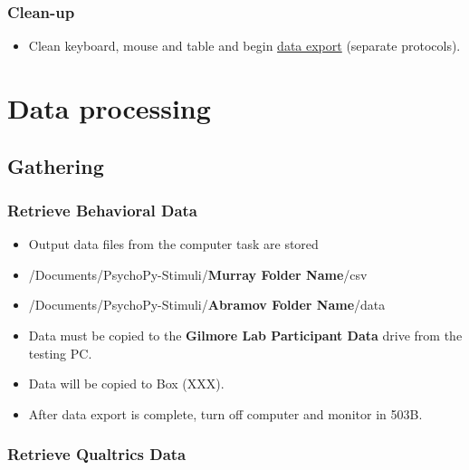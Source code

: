 \documentclass[]{article}
\providecommand{\tightlist}{%
  \setlength{\itemsep}{0pt}\setlength{\parskip}{0pt}}
\begin{document}
\subsubsection{Clean-up}\label{clean-up}

\begin{itemize}
\tightlist
\item
  Clean keyboard, mouse and table and begin
  \href{sex-differences-data-export.md}{data export} (separate
  protocols).
\end{itemize}

\section{Data processing}\label{data-processing}

\subsection{Gathering}\label{gathering}

\subsubsection{Retrieve Behavioral Data}\label{retrieve-behavioral-data}

\begin{itemize}
\item
  Output data files from the computer task are stored
\item
  /Documents/PsychoPy-Stimuli/\textbf{Murray Folder Name}/csv
\item
  /Documents/PsychoPy-Stimuli/\textbf{Abramov Folder Name}/data
\item
  Data must be copied to the \textbf{Gilmore Lab Participant Data} drive
  from the testing PC.
\item
  Data will be copied to Box (XXX).
\item
  After data export is complete, turn off computer and monitor in 503B.
\end{itemize}

\subsubsection{Retrieve Qualtrics Data}\label{retrieve-qualtrics-data}
\end{document}
